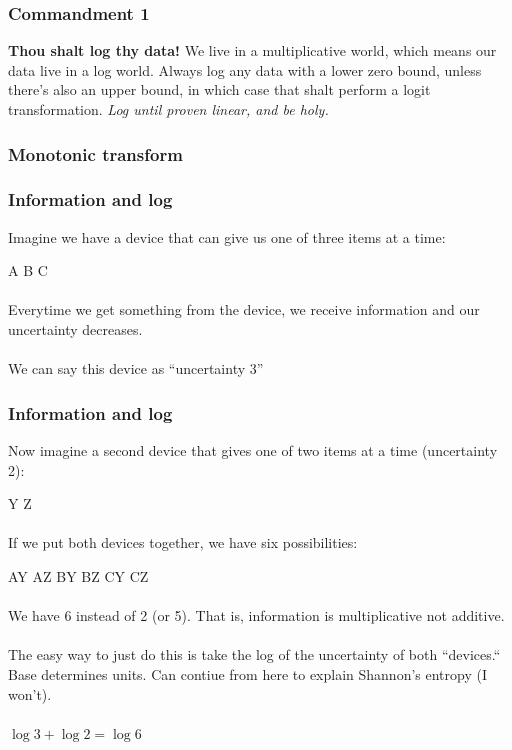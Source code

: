 \documentclass{beamer}
\begin{document}
  \begin{frame}
    \frametitle{Commandment 1}
    \textbf{Thou shalt log thy data! }
    We live in a multiplicative world, which means our data live in a log world. 
    Always log any data with a lower zero bound, unless there's also an upper bound, 
    in which case that shalt perform a logit transformation. 
    \emph{Log until proven linear, and be holy.}
  \end{frame}
  
  
  \begin{frame}
    \frametitle{Monotonic transform}
  \end{frame}
  
  
  \begin{frame}
    \frametitle{Information and log}
    Imagine we have a device that can give us one of three items at a time: 
    
    A B C
    \\~\\
    Everytime we get something from the device, we receive information and our uncertainty decreases.
    \\~\\
    We can say this device as ``uncertainty 3''
  \end{frame}



  \begin{frame}
    \frametitle{Information and log}
    Now imagine a second device that gives one of two items at a time (uncertainty 2): 
    
    Y Z
    \\~\\
    If we put both devices together, we have six possibilities:
    
    AY AZ BY BZ CY CZ
    \\~\\
    We have 6 instead of 2 (or 5). That is, information is multiplicative not additive. 
    \\~\\
    The easy way to just do this is take the log of the uncertainty of both ``devices.`` Base determines units. Can contiue from here to explain Shannon's entropy (I won't).
    \\~\\
    \(\log 3 + \log 2 = \log 6\)
  \end{frame}
  
\end{document}
